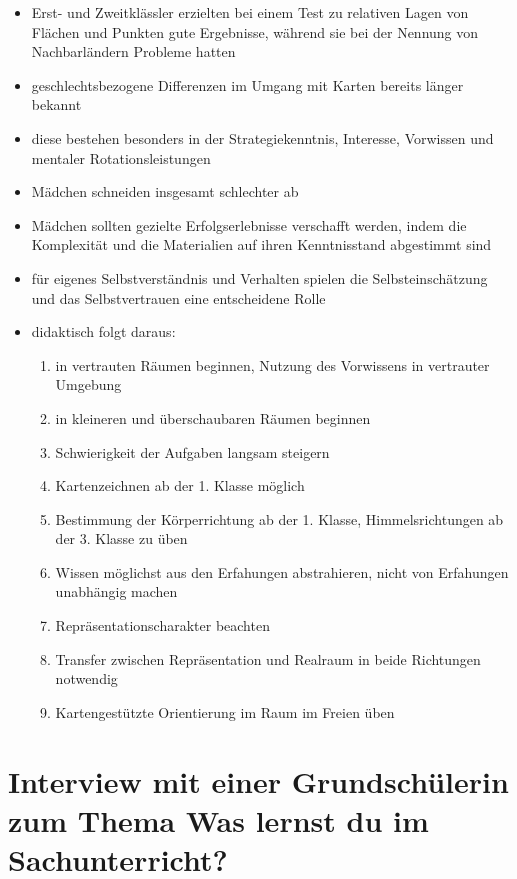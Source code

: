 \begin{enumerate}
{\begin{itemize}
			\item{Erst- und Zweitklässler erzielten bei einem Test zu relativen Lagen von Flächen und Punkten gute Ergebnisse, während sie bei der Nennung von Nachbarländern Probleme hatten}
			\item{geschlechtsbezogene Differenzen im Umgang mit Karten bereits länger bekannt}
			\item{diese bestehen besonders in der Strategiekenntnis, Interesse, Vorwissen und mentaler Rotationsleistungen}
			\item{Mädchen schneiden insgesamt schlechter ab}
			\item{Mädchen sollten gezielte Erfolgserlebnisse verschafft werden, indem die Komplexität und die Materialien auf ihren Kenntnisstand abgestimmt sind}
			\item{für eigenes Selbstverständnis und Verhalten spielen die Selbsteinschätzung und das Selbstvertrauen eine entscheidene Rolle}
			\item{
				didaktisch folgt daraus:
				\begin{enumerate}
					\item{in vertrauten Räumen beginnen, Nutzung des Vorwissens in vertrauter Umgebung}
					\item{in kleineren und überschaubaren Räumen beginnen}
					\item{Schwierigkeit der Aufgaben langsam steigern}
					\item{Kartenzeichnen ab der 1. Klasse möglich}
					\item{Bestimmung der Körperrichtung ab der 1. Klasse, Himmelsrichtungen ab der 3. Klasse zu üben}
					\item{Wissen möglichst aus den Erfahungen abstrahieren, nicht von Erfahungen unabhängig machen}
					\item{Repräsentationscharakter beachten}
					\item{Transfer zwischen Repräsentation und Realraum in beide Richtungen notwendig}
					\item{Kartengestützte Orientierung im Raum im Freien üben}
				\end{enumerate}
			}
		\end{itemize}
	} 
\end{enumerate} 

\newpage 
\section{Interview mit einer Grundschülerin zum Thema \glqq Was lernst du im Sachunterricht?\grqq{}}

